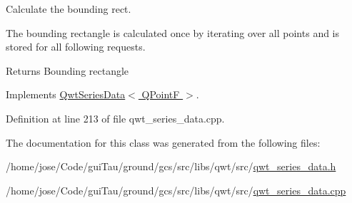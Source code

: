Calculate the bounding rect. 

The bounding rectangle is calculated once by iterating over all points and is stored for all following requests.

\begin{DoxyReturn}{Returns}
Bounding rectangle 
\end{DoxyReturn}


Implements \hyperlink{class_qwt_series_data_aedb969ba51a27d88d26ad7f7cb1c2c7f}{Qwt\-Series\-Data$<$ Q\-Point\-F $>$}.



Definition at line 213 of file qwt\-\_\-series\-\_\-data.\-cpp.



The documentation for this class was generated from the following files\-:\begin{DoxyCompactItemize}
\item 
/home/jose/\-Code/gui\-Tau/ground/gcs/src/libs/qwt/src/\hyperlink{qwt__series__data_8h}{qwt\-\_\-series\-\_\-data.\-h}\item 
/home/jose/\-Code/gui\-Tau/ground/gcs/src/libs/qwt/src/\hyperlink{qwt__series__data_8cpp}{qwt\-\_\-series\-\_\-data.\-cpp}\end{DoxyCompactItemize}
